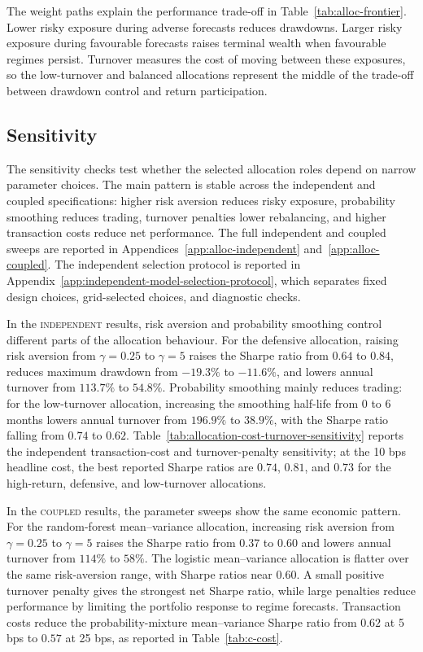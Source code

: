 \documentclass[10pt]{article}
\newcommand{\Acoup}{\textsc{coupled}}
\newcommand{\Bindep}{\textsc{independent}}
\begin{document}
The weight paths explain the performance trade-off in Table~\ref{tab:alloc-frontier}. Lower
risky exposure during adverse forecasts reduces drawdowns. Larger risky exposure during
favourable forecasts raises terminal wealth when favourable regimes persist. Turnover measures
the cost of moving between these exposures, so the low-turnover and balanced allocations
represent the middle of the trade-off between drawdown control and return participation.


\subsection{Sensitivity}

The sensitivity checks test whether the selected allocation roles depend on narrow parameter
choices. The main pattern is stable across the independent and coupled specifications:
higher risk aversion reduces risky exposure, probability smoothing reduces trading, turnover
penalties lower rebalancing, and higher transaction costs reduce net performance. The full
independent and coupled sweeps are reported in Appendices~\ref{app:alloc-independent}
and~\ref{app:alloc-coupled}. The independent selection protocol is reported in
Appendix~\ref{app:independent-model-selection-protocol}, which separates fixed design
choices, grid-selected choices, and diagnostic checks.

In the \Bindep{} results, risk aversion and probability smoothing control different parts of
the allocation behaviour. For the defensive allocation, raising risk aversion from
\(\gamma=0.25\) to \(\gamma=5\) raises the Sharpe ratio from \(0.64\) to \(0.84\), reduces
maximum drawdown from \(-19.3\%\) to \(-11.6\%\), and lowers annual turnover from
\(113.7\%\) to \(54.8\%\). Probability smoothing mainly reduces trading: for the
low-turnover allocation, increasing the smoothing half-life from \(0\) to \(6\) months lowers
annual turnover from \(196.9\%\) to \(38.9\%\), with the Sharpe ratio falling from \(0.74\)
to \(0.62\). Table~\ref{tab:allocation-cost-turnover-sensitivity} reports the independent
transaction-cost and turnover-penalty sensitivity; at the 10 bps headline cost, the best
reported Sharpe ratios are \(0.74\), \(0.81\), and \(0.73\) for the high-return, defensive,
and low-turnover allocations.

In the \Acoup{} results, the parameter sweeps show the same economic pattern. For the
random-forest mean--variance allocation, increasing risk aversion from \(\gamma=0.25\) to
\(\gamma=5\) raises the Sharpe ratio from \(0.37\) to \(0.60\) and lowers annual turnover
from \(114\%\) to \(58\%\). The logistic mean--variance allocation is flatter over the same
risk-aversion range, with Sharpe ratios near \(0.60\). A small positive turnover penalty gives
the strongest net Sharpe ratio, while large penalties reduce performance by limiting the
portfolio response to regime forecasts. Transaction costs reduce the probability-mixture
mean--variance Sharpe ratio from \(0.62\) at 5 bps to \(0.57\) at 25 bps, as reported in
Table~\ref{tab:c-cost}.
\end{document}
